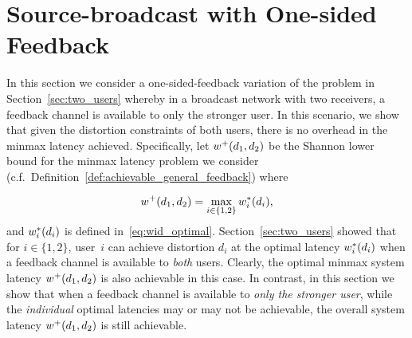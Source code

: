 \section{Source-broadcast with One-sided Feedback}
\label{sec:one_sided_feedback}

In this section we consider a one-sided-feedback variation of the problem in Section~\ref{sec:two_users} whereby in a broadcast network with two receivers, a feedback channel is available to only the stronger user.  In this scenario, we show that given the distortion constraints of both users, there is no overhead in the minmax latency achieved.  Specifically, let $w^{+}(d_1, d_2)$ be the Shannon lower bound for the minmax latency problem we consider (c.f.\ Definition~\ref{def:achievable_general_feedback}) where

\begin{align}
\label{eq:wplusd}
	w^{+}(d_1, d_2) = \max_{i \in \{1, 2\}} w_{i}^{*}(d_i),
\end{align}
and $w_{i}^{*}(d_i)$ is defined in~\eqref{eq:wid_optimal}.
Section~\ref{sec:two_users} showed that for $i \in \{1, 2\}$, user~$i$ can achieve distortion $d_i$ at the optimal latency $w_{i}^{*}(d_i)$ when a feedback channel is available to \emph{both} users.  Clearly, the optimal minmax system latency $w^{+}(d_1, d_2)$ is also achievable in this case.  In contrast, in this section we show that when a feedback channel is available to \emph{only the stronger user}, while the \emph{individual} optimal latencies may or may not be achievable, the overall system latency $w^{+}(d_1, d_2)$ is still achievable.






